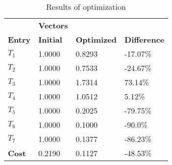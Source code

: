 \begin{table}[H]
\centering
\begin{tabular}{llll}
\textbf{}      & \cellcolor[HTML]{EFEFEF}\textbf{Vectors} & \textbf{} & \textbf{}         \\
\rowcolor[HTML]{EFEFEF} 
\textbf{Entry} & \textbf{Initial} & \textbf{Optimized} & \textbf{Difference} \\
$T_1$ & 1.0000 & 0.8293 & -17.07\% \\ 
$T_2$ & 1.0000 & 0.7533 & -24.67\% \\ 
$T_3$ & 1.0000 & 1.7314 & 73.14\% \\ 
$T_4$ & 1.0000 & 1.0512 & 5.12\% \\ 
$T_5$ & 1.0000 & 0.2025 & -79.75\% \\ 
$T_6$ & 1.0000 & 0.1000 & -90.0\% \\ 
$T_7$ & 1.0000 & 0.1377 & -86.23\% \\ 
\rowcolor[HTML]{EFEFEF} 
\textbf{Cost}  & 0.2190 & 0.1127 & -48.53\% \\ 
\end{tabular}
\caption{Results of optimization}
\label{tab:OptimizationAnalysis}
\end{table}